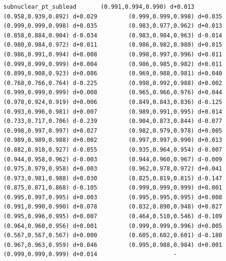 \documentclass[11pt, letterpaper, openany]{book}
\begin{document}
\begin{empiricalbox}
\begin{lstlisting}[style=terminal]
subnuclear_pt_sublead       (0.991,0.994,0.990) d+0.013         (0.958,0.939,0.892) d+0.029         (0.999,0.999,0.998) d+0.035         (0.999,0.999,0.998) d+0.035         (0.983,0.977,0.962) d+0.013         (0.858,0.884,0.904) d-0.034         (0.983,0.984,0.963) d-0.014         (0.980,0.984,0.972) d+0.011         (0.986,0.982,0.980) d+0.015         (0.986,0.991,0.994) d+0.008         (0.998,0.997,0.996) d+0.011         (0.999,0.999,0.999) d+0.004         (0.986,0.985,0.982) d+0.011         (0.899,0.908,0.923) d+0.086         (0.969,0.988,0.981) d+0.040         (0.768,0.766,0.764) d-0.225         (0.998,0.992,0.988) d+0.002         (0.999,0.999,0.999) d+0.008         (0.965,0.966,0.976) d+0.044         (0.978,0.924,0.919) d+0.006         (0.849,0.843,0.836) d-0.125         (0.993,0.996,0.981) d+0.007         (0.989,0.991,0.995) d+0.014         (0.733,0.717,0.706) d-0.239         (0.904,0.873,0.844) d-0.077         (0.998,0.997,0.997) d+0.027         (0.982,0.979,0.978) d+0.005         (0.989,0.989,0.988) d+0.002         (0.997,0.997,0.990) d+0.013         (0.882,0.918,0.927) d-0.055         (0.935,0.964,0.954) d-0.007         (0.944,0.958,0.962) d-0.003         (0.944,0.960,0.967) d-0.009         (0.975,0.979,0.958) d+0.003         (0.962,0.978,0.972) d+0.041         (0.973,0.981,0.988) d+0.030         (0.825,0.819,0.815) d-0.147         (0.875,0.871,0.868) d-0.105         (0.999,0.999,0.999) d+0.001         (0.995,0.997,0.995) d+0.003         (0.995,0.995,0.995) d+0.008         (0.991,0.990,0.990) d+0.078         (0.832,0.890,0.948) d+0.027         (0.995,0.996,0.995) d+0.007         (0.464,0.510,0.546) d-0.109         (0.964,0.960,0.956) d+0.001         (0.999,0.999,0.996) d+0.005         (0.567,0.567,0.567) d+0.000         (0.605,0.602,0.601) d-0.180         (0.967,0.963,0.959) d+0.046         (0.995,0.988,0.984) d+0.001         (0.999,0.999,0.999) d+0.014                      -                  


\end{lstlisting}
\end{empiricalbox}
\end{document}
